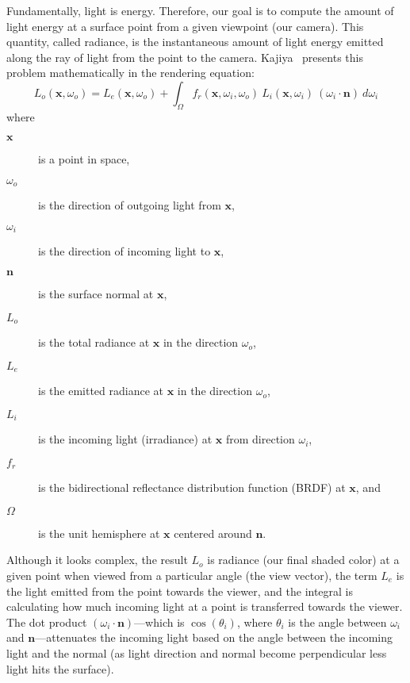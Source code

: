 Fundamentally, light is energy. Therefore, our goal is to compute the amount of light energy at a surface point from a given viewpoint (our camera). This quantity, called radiance, is the instantaneous amount of light energy emitted along the ray of light from the point to the camera. Kajiya~\cite{kajiya1986rendering} presents this problem mathematically in the rendering equation:
\begin{equation*}
    L_o(\bm{x}, \omega_o) = L_e(\bm{x}, \omega_o) + \int_\Omega f_r(\bm{x}, \omega_i, \omega_o)\ L_i(\bm{x}, \omega_i)\ (\omega_i \cdot \bm{n})\ d\omega_i
\end{equation*}
where
\begin{description}
    \item[$\bm{x}$] is a point in space,
    \item[$\omega_o$] is the direction of outgoing light from $\bm{x}$,
    \item[$\omega_i$] is the direction of incoming light to $\bm{x}$,
    \item[$\bm{n}$] is the surface normal at $\bm{x}$, 
    \item[$L_o$] is the total radiance at $\bm{x}$ in the direction $\omega_o$,
    \item[$L_e$] is the emitted radiance at $\bm{x}$ in the direction $\omega_o$,
    \item[$L_i$] is the incoming light (irradiance) at $\bm{x}$ from direction $\omega_i$,
    \item[$f_r$] is the bidirectional reflectance distribution function (BRDF) at $\bm{x}$, and
    \item[$\Omega$] is the unit hemisphere at $\bm{x}$ centered around $\bm{n}$.
\end{description}

Although it looks complex, the result $L_o$ is radiance (our final shaded color) at a given point when viewed from a particular angle (the view vector), the term $L_e$ is the light emitted from the point towards the viewer, and the integral is calculating how much incoming light at a point is transferred towards the viewer. The dot product $(\omega_i \cdot \bm{n})$---which is $\cos(\theta_i)$, where $\theta_i$ is the angle between $\omega_i$ and $\bm{n}$---attenuates the incoming light based on the angle between the incoming light and the normal (as light direction and normal become perpendicular less light hits the surface).


